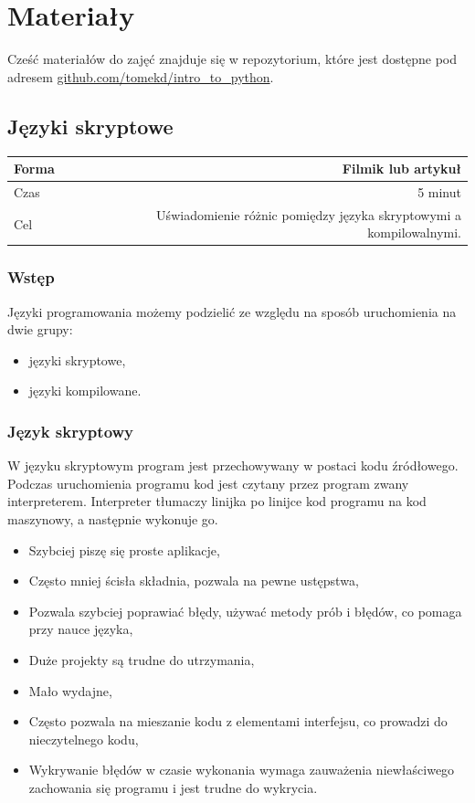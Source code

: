 \documentclass{mwart}
\newcommand*\tick{\item[\Checkmark]}
\newcommand*\fail{\item[\XSolidBrush]}
\begin{document}
\section{Materiały}
Cześć materiałów do zajęć znajduje się w repozytorium, które jest dostępne pod adresem
\url{github.com/tomekd/intro_to_python}.

\subsection{Języki skryptowe}
\begin{center}
  \begin{tabular}{lr}
    \toprule
    Forma & Filmik lub artykuł \\
    \midrule
    Czas & 5 minut \\
    Cel & Uświadomienie różnic pomiędzy języka skryptowymi a kompilowalnymi. \\
    \bottomrule
  \end{tabular}
\end{center}

\subsubsection{Wstęp}
Języki programowania możemy podzielić ze względu na sposób uruchomienia na dwie grupy:

\begin{itemize}
  \item języki skryptowe,
  \item języki kompilowane.
\end{itemize}

\subsubsection{Język skryptowy}
W języku skryptowym program jest przechowywany w postaci kodu źródłowego. Podczas
uruchomienia programu kod jest czytany przez program zwany interpreterem. Interpreter
tłumaczy linijka po linijce kod programu na kod maszynowy, a następnie wykonuje go.

\begin{itemize}
    \tick Szybciej piszę się proste aplikacje,
    \tick Często mniej ścisła składnia, pozwala na pewne ustępstwa,
    \tick Pozwala szybciej poprawiać błędy, używać metody prób i błędów,
    co pomaga przy nauce języka,
    \fail Duże projekty są trudne do utrzymania,
    \fail Mało wydajne,
    \fail Często pozwala na mieszanie kodu z elementami interfejsu, co prowadzi 
    do nieczytelnego kodu,
    \fail Wykrywanie błędów w czasie wykonania wymaga zauważenia niewłaściwego zachowania się
    programu i jest trudne do wykrycia.
\end{itemize}
\end{document}
